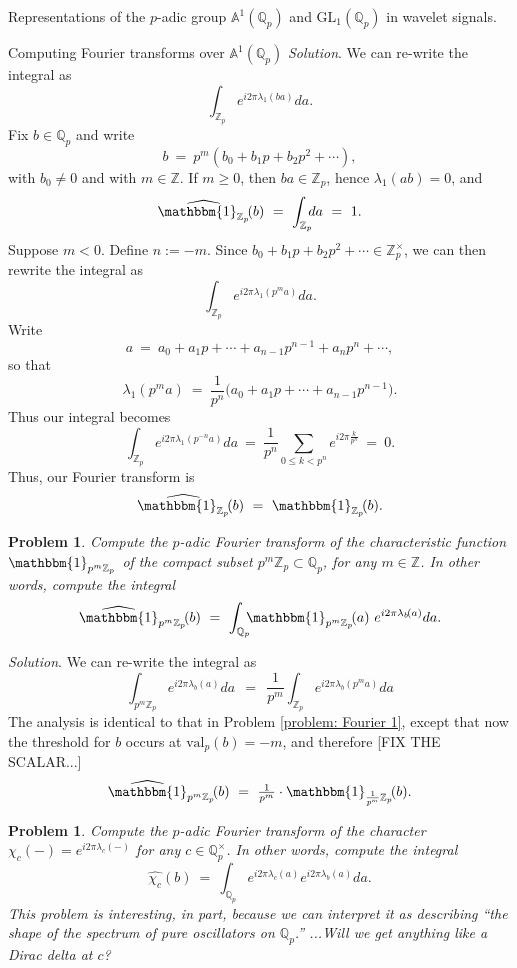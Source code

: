 \documentclass[letterpaper,11pt, reqno]{amsart}
\newtheorem{monodromy theorem}{Monodromy Theorem}[subsection]
\newtheorem{wild conjecture}[theorem]{Wild Conjecture}
\newtheorem{research objectives}{Research objectives}[subsection]
\newtheorem{research question}[theorem]{Research questions}
\newtheorem{aside question}[theorem]{Aside question}
\newtheorem{problem}[theorem]{Problem}
\newtheorem{audio example}[theorem]{\loudspeaker[3] Example}
\newtheorem{blank remark}[theorem]{}
\newtheorem{terminology and comment}[theorem]{Terminology and comment}
\newtheorem{purity hypothesis}[theorem]{Purity hypothesis}
\newtheorem{corollary of the purity hypothesis}[theorem]{Corollary of the purity hypothesis}
\newcommand{\QQ} {{\mathbb Q}}
\newcommand{\ZZ} {{\mathbb Z}}
\numberwithin{equation}{theorem}
\begin{document}
\begin{section}{Representations of the $p$-adic group $\mathbb{A}^{\!1}(\mathbb{Q}_{p})$
and $\text{GL}_{1}(\mathbb{Q}_{p})$
in wavelet signals.}
\begin{subsection}{Computing Fourier transforms over $\mathbb{A}^{\!1}(\QQ_{p})$}
\noindent
{\em Solution}.
We can re-write the integral as
	$$
	\int_{\ZZ_{p}}e^{i2\pi\lambda_{1\!}(ba)}da.
	$$
Fix $b\in\QQ_{p}$ and write
	$$
	b\ =\ p^{m}(b_{0}+b_1 p+b_2p^2+\cdots),
	$$
with $b_0\neq 0$ and with $m\in\ZZ$. If $m\ge 0$, then $ba\in \ZZ_p$, hence $\lambda_{1}(ab)=0$, and
	$$
	\widehat{\mathbbm{1}_{\ZZ_{p}}}\!(b)
	\ =\ 
	\int_{\ZZ_p}\!\!\!da
	\ =\ 
	1.
	$$
Suppose $m<0$. Define $n:=-m$. Since $b_{0}+b_1 p+b_2p^2+\cdots\in\ZZ^\times_{p}$, we can then rewrite the integral as
	$$
	\int_{\ZZ_{p}}e^{i2\pi\lambda_{1\!}(p^ma)}da.
	$$
Write
	$$
	a
	\ =\ 
	a_0+a_1p+\cdots+a_{n-1} p^{n-1}+a_{n}p^{n}+\cdots,
	$$
so that
	$$
	\lambda_1(p^m a)
	\ =\ 
	\frac{1}{p^n}\big(a_0+a_1p+\cdots+a_{n-1}p^{n-1}\big).
	$$
Thus our integral becomes
	$$
	\int_{\ZZ_{p}}e^{i2\pi\lambda_{1\!}(p^{-n}a)}da
	\ =\ 
	\frac{1}{p^n}\sum_{0\le k<p^n}\!\!e^{i2\pi\tfrac{k}{p^n}}
	\ =\ 0.
	$$
Thus, our Fourier transform is
	$$
	\widehat{\mathbbm{1}_{\ZZ_{p}}}\!(b)
	\ =\ 
	\mathbbm{1}_{\ZZ_{p}}\!(b).
	$$

\begin{problem}
\normalfont
Compute the $p$-adic Fourier transform of the characteristic function $\mathbbm{1}_{p^{m}\ZZ_{p}}$ of the compact subset $p^{m}\ZZ_{p}\subset\QQ_{p}$, for any $m\in\ZZ$. In other words, compute the integral
	$$\widehat{\mathbbm{1}}_{p^{m}\ZZ_{p}}\!(b)
	\ =\ 
	\int_{\QQ_{p}}\!\!\!\mathbbm{1}_{p^{m}\ZZ_{p}}\!(a)\ e^{i2\pi\lambda_{b\!}(a)}da.
	$$
\end{problem}

\noindent
{\em Solution}.
We can re-write the integral as
	$$
	\int_{p^m\ZZ_{p}}\!\!\!e^{i2\pi\lambda_{b\!}(a)}da
	\ \ =\ \ 
	\frac{1}{p^m}\int_{\ZZ_{p}}\!\!\!e^{i2\pi\lambda_{b\!}(p^ma)}da
	$$
The analysis is identical to that in Problem \ref{problem: Fourier 1}, except that now the threshold for $b$ occurs at $\text{val}_{p}(b)=-m$, and therefore {\color{red} [FIX THE SCALAR...]}
	$$
	\widehat{\mathbbm{1}}_{p^m\ZZ_{p}}\!(b)
	\ =\ 
	\tfrac{1}{p^m}\cdot\mathbbm{1}_{\scalebox{.8}{$\tfrac{1}{p^m}$}\ZZ_{p}}\!(b).
	$$

\begin{problem}
\normalfont
Compute the $p$-adic Fourier transform of the character $\chi_{c}(-)=e^{i2\pi\lambda_{c}(-)}$ for any $c\in\QQ^\times_p$. In other words, compute the integral
	$$\widehat{\chi_c}(b)
	\ =\ 
	\int_{\QQ_{p}}\!\!\!e^{i2\pi\lambda_{c}(a)}e^{i2\pi\lambda_{b\!}(a)}da.
	$$
This problem is interesting, in part, because we can interpret it as describing ``the shape of the spectrum of pure oscillators on $\QQ_{p}$.'' ...Will we get anything like a Dirac delta at $c$?
\end{problem}


\end{subsection}
\end{section}
\end{document}
